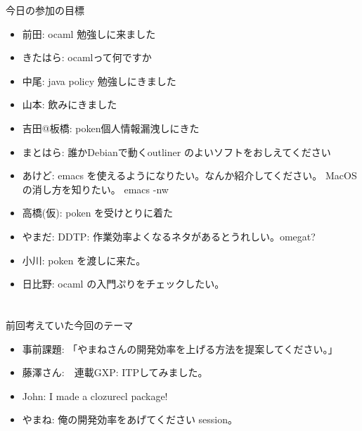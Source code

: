 \frame{\titlepage{}}


\begin{frame}{今日の参加の目標}
\begin{itemize}
 \item 前田: ocaml 勉強しに来ました
 \item きたはら: ocamlって何ですか
 \item 中尾: java policy 勉強しにきました
 \item 山本: 飲みにきました
 \item 吉田@板橋: poken個人情報漏洩しにきた
 \item まとはら: 誰かDebianで動くoutliner のよいソフトをおしえてください
 \item あけど: emacs を使えるようになりたい。なんか紹介してください。
       MacOSの消し方を知りたい。 emacs -nw
 \item 高橋(仮): poken を受けとりに着た
 \item やまだ: DDTP: 作業効率よくなるネタがあるとうれしい。omegat?
 \item 小川: poken を渡しに来た。
 \item 日比野: ocaml の入門ぷりをチェックしたい。
\end{itemize}
\end{frame}

\section{}
\begin{frame}{前回考えていた今回のテーマ}
\begin{itemize}
 \item 事前課題: 「やまねさんの開発効率を上げる方法を提案してください。」
 \item 藤澤さん:　連載GXP: ITPしてみました。
 \item John: I made a clozurecl package!
 \item やまね: 俺の開発効率をあげてください session。
\end{itemize}
\end{frame}


